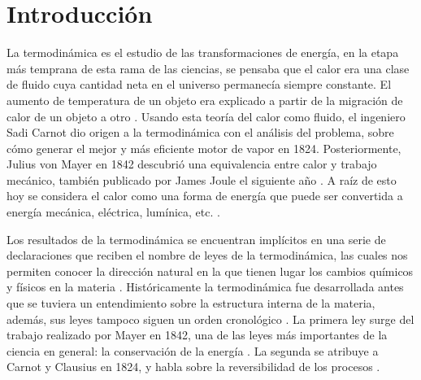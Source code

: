 
%


\newcommand{\keyword}[1]{\textit{#1}}


\section{Introducción}
	La termodinámica es el estudio de las transformaciones de energía, en la etapa más temprana de esta rama de las ciencias, se pensaba que el calor era una clase de fluido cuya cantidad neta en el universo permanecía siempre constante. El aumento de temperatura de un objeto era explicado a partir de la migración de calor de un objeto a otro \cite{feynman2011feynman, fermi1986}. Usando esta teoría del calor como fluido, el ingeniero Sadi Carnot dio origen a la termodinámica con el análisis del problema, sobre cómo generar el mejor y más eficiente motor de vapor en 1824. Posteriormente, Julius von Mayer en 1842 descubrió una equivalencia entre calor y trabajo mecánico, también publicado por James Joule el siguiente año \cite{fermi1986}. A raíz de esto hoy se considera el calor como una forma de energía que puede ser convertida a energía mecánica, eléctrica, lumínica, etc. \cite{fermi1986}.
	
	Los resultados de la termodinámica se encuentran implícitos en una serie de declaraciones que reciben el nombre de leyes de la termodinámica, las cuales nos permiten conocer la dirección natural en la que tienen lugar los cambios químicos y físicos en la materia \cite{atkins2011physical}. Históricamente la termodinámica fue desarrollada antes que se tuviera un entendimiento sobre la estructura interna de la materia, además, sus leyes tampoco siguen un orden cronológico \cite{feynman2011feynman}. La primera ley surge del trabajo realizado por Mayer en 1842, una de las leyes más importantes de la ciencia en general: la conservación de la energía \cite{feynman2011feynman, fermi1986}. La segunda se atribuye a Carnot y Clausius en 1824, y habla sobre la reversibilidad de los procesos \cite{feynman2011feynman}.
	
